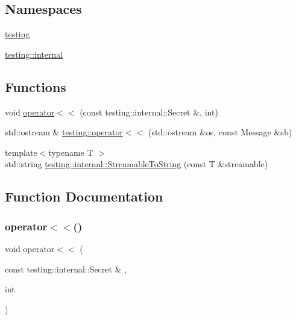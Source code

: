 \subsection*{Namespaces}
\begin{DoxyCompactItemize}
\item 
 \hyperlink{namespacetesting}{testing}
\item 
 \hyperlink{namespacetesting_1_1internal}{testing\+::internal}
\end{DoxyCompactItemize}
\subsection*{Functions}
\begin{DoxyCompactItemize}
\item 
void \hyperlink{gtest-message_8h_ae8f0c86e5c506587b62315e24a918563}{operator$<$$<$} (const testing\+::internal\+::\+Secret \&, int)
\item 
std\+::ostream \& \hyperlink{namespacetesting_a7b802e532fd68749765cb7dc156130db}{testing\+::operator$<$$<$} (std\+::ostream \&os, const Message \&sb)
\item 
{\footnotesize template$<$typename T $>$ }\\std\+::string \hyperlink{namespacetesting_1_1internal_aad4beed95d0846e6ffc5da0978ef3bb9}{testing\+::internal\+::\+Streamable\+To\+String} (const T \&streamable)
\end{DoxyCompactItemize}


\subsection{Function Documentation}
\mbox{\label{gtest-message_8h_ae8f0c86e5c506587b62315e24a918563}} 
\subsubsection{\texorpdfstring{operator$<$$<$()}{operator<<()}}
{\footnotesize\ttfamily void operator$<$$<$ (\begin{DoxyParamCaption}\item[{const testing\+::internal\+::\+Secret \&}]{,  }\item[{int}]{ }\end{DoxyParamCaption})}

